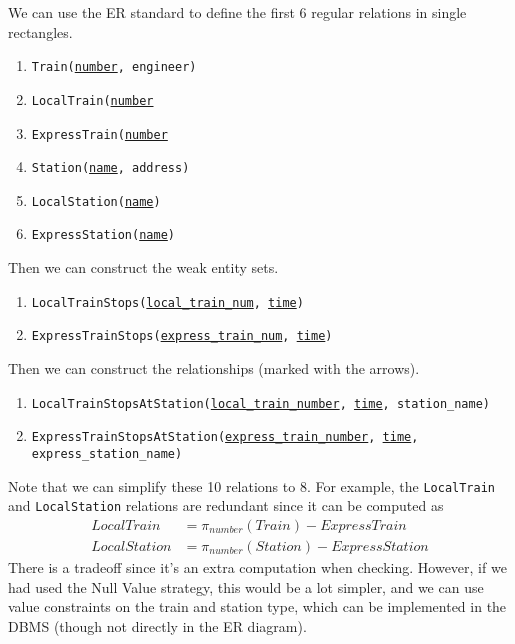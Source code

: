 \begin{example}
    We can use the ER standard to define the first 6 regular relations in single rectangles.  
    \begin{enumerate}
      \item \texttt{Train(\underline{number}, engineer)}
      \item \texttt{LocalTrain(\underline{number}}
      \item \texttt{ExpressTrain(\underline{number}}
      \item \texttt{Station(\underline{name}, address)}
      \item \texttt{LocalStation(\underline{name})}
      \item \texttt{ExpressStation(\underline{name})}
    \end{enumerate}
    Then we can construct the weak entity sets. 
    \begin{enumerate}
      \item \texttt{LocalTrainStops(\underline{local\_train\_num}, \underline{time})}
      \item \texttt{ExpressTrainStops(\underline{express\_train\_num}, \underline{time})}
    \end{enumerate}
    Then we can construct the relationships (marked with the arrows).  
    \begin{enumerate}
      \item \texttt{LocalTrainStopsAtStation(\underline{local\_train\_number}, \underline{time}, station\_name)}
      \item \texttt{ExpressTrainStopsAtStation(\underline{express\_train\_number}, \underline{time}, express\_station\_name)}
    \end{enumerate}
    Note that we can simplify these 10 relations to 8. For example, the \texttt{LocalTrain} and \texttt{LocalStation} relations are redundant since it can be computed as 
    \begin{align}
      LocalTrain & = \pi_{number} (Train) - ExpressTrain \\
      LocalStation & = \pi_{number} (Station) - ExpressStation
    \end{align}
    There is a tradeoff since it's an extra computation when checking. However, if we had used the Null Value strategy, this would be a lot simpler, and we can use value constraints on the train and station type, which can be implemented in the DBMS (though not directly in the ER diagram). 
  \end{example}

